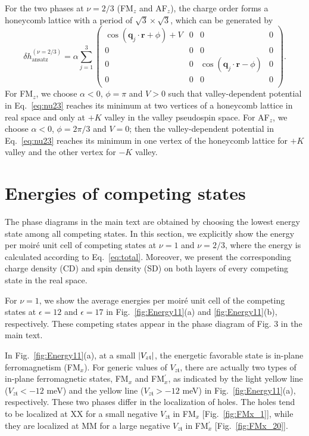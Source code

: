 \documentclass[aps,prl,onecolumn,superscriptaddress,longbibliography]{revtex4-2}
\begin{document}
For the two phases at $\nu=2/3$ (FM$_z$ and AF$_z$), the charge order forms a honeycomb lattice with a period of $\sqrt{3} \times \sqrt{3}$, which can be generated by
\begin{equation}\label{eq:nu23}
    \delta h_{\text{ansatz}}^{(\nu=2/3)}=\alpha
    \sum_{j=1}^{3}
    \begin{pmatrix}
        \cos(\bm{q}_{j}\cdot \bm{r}+\phi)+ V & 0 & 0 & 0\\
        0 & 0 & 0 & 0\\
        0 & 0 & \cos(\bm{q}_{j}\cdot \bm{r}-\phi) & 0\\
        0 & 0 & 0 & 0\\
    \end{pmatrix}.
\end{equation} 
For FM$_z$, we choose $\alpha<0$, $\phi=\pi$ and $V>0$  such that valley-dependent potential in Eq.~\eqref{eq:nu23} reaches its minimum at two vertices of a honeycomb lattice in real space and only at $+K$ valley in the valley pseudospin space. For AF$_z$, we choose $\alpha<0$, $\phi=2\pi/3$ and $V=0$; then the valley-dependent potential in Eq.~\eqref{eq:nu23} reaches its minimum in one vertex of the honeycomb lattice for $+K$ valley and the other vertex for $-K$ valley.


\section{Energies of competing states}
The phase diagrams in the main text are obtained by choosing the lowest energy state among all competing states. In this section, we explicitly show the energy per moir\'e unit cell of competing states at $\nu=1$ and $\nu=2/3$, where the energy is calculated according to Eq.~\eqref{eq:total}. Moreover, we present the corresponding charge density (CD) and spin density (SD) on both layers of every competing state in the real space. 

For $\nu=1$, we show  the average energies per moir\'e unit cell of the competing states at  $\epsilon=12$ and $\epsilon=17$ in Fig.~\ref{fig:Energy11}(a) and \ref{fig:Energy11}(b), respectively. These competing states appear in the phase diagram of Fig. 3 in the main text. 

{In Fig.~\ref{fig:Energy11}(a), at a small $\abs{V_{z\mathfrak{t}}}$, the energetic favorable state is in-plane ferromagnetism (FM$_x$). For generic values of $V_{z\mathfrak{t}}$, there are actually two types of in-plane ferromagnetic states, FM$_x$ and FM$_x^\prime$, as indicated by the light yellow line  ($V_{z\mathfrak{t}}<-12$ meV) and the yellow line ($V_{z\mathfrak{t}}>-12$ meV)  in Fig.~\ref{fig:Energy11}(a), respectively. These two phases differ in the localization of holes. The holes tend to be localized at XX for a small negative $V_{z\mathfrak{t}}$ in FM$_x$ [Fig.~\ref{fig:FMx_1}], while they are localized at MM for a large negative $V_{z\mathfrak{t}}$ in FM$_x^\prime$ [Fig.~\ref{fig:FMx_20}].}
\end{document}
